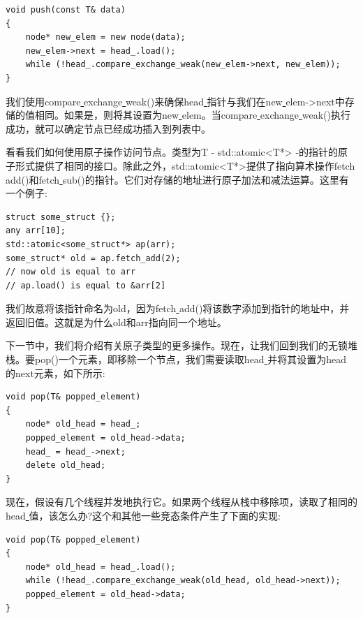 \begin{lstlisting}[caption={}]
void push(const T& data)
{
	node* new_elem = new node(data);
	new_elem->next = head_.load();
	while (!head_.compare_exchange_weak(new_elem->next, new_elem));
}
\end{lstlisting}

我们使用compare\underline{ }exchange\underline{ }weak()来确保head\underline{ }指针与我们在new\underline{ }elem->next中存储的值相同。如果是，则将其设置为new\underline{ }elem。当compare\underline{ }exchange\underline{ }weak()执行成功，就可以确定节点已经成功插入到列表中。 \par
看看我们如何使用原子操作访问节点。类型为T - std::atomic<T*> -的指针的原子形式提供了相同的接口。除此之外，std::atomic<T*>提供了指向算术操作fetch\underline{ }add()和fetch\underline{ }sub()的指针。它们对存储的地址进行原子加法和减法运算。这里有一个例子: \par

\begin{lstlisting}[caption={}]
struct some_struct {};
any arr[10];
std::atomic<some_struct*> ap(arr);
some_struct* old = ap.fetch_add(2);
// now old is equal to arr
// ap.load() is equal to &arr[2]
\end{lstlisting}

我们故意将该指针命名为old，因为fetch\underline{ }add()将该数字添加到指针的地址中，并返回旧值。这就是为什么old和arr指向同一个地址。 \par
下一节中，我们将介绍有关原子类型的更多操作。现在，让我们回到我们的无锁堆栈。要pop()一个元素，即移除一个节点，我们需要读取head\underline{ }并将其设置为head\underline{ }的next元素，如下所示:\par

\begin{lstlisting}[caption={}]
void pop(T& popped_element)
{
	node* old_head = head_;
	popped_element = old_head->data;
	head_ = head_->next;
	delete old_head;
}
\end{lstlisting}

现在，假设有几个线程并发地执行它。如果两个线程从栈中移除项，读取了相同的head\underline{ }值，该怎么办?这个和其他一些竞态条件产生了下面的实现: \par

\begin{lstlisting}[caption={}]
void pop(T& popped_element)
{
	node* old_head = head_.load();
	while (!head_.compare_exchange_weak(old_head, old_head->next));
	popped_element = old_head->data;
}
\end{lstlisting}

